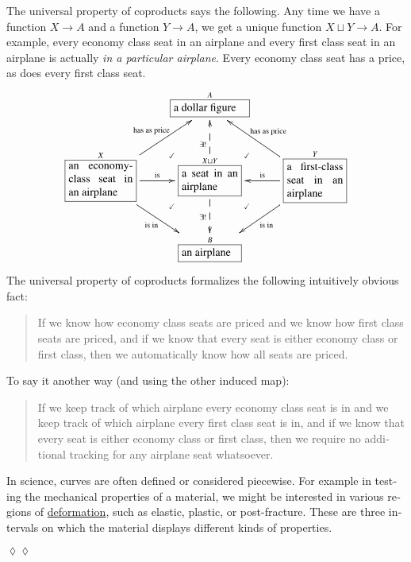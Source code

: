 \documentclass{book}
\def\tn{\textnormal}
\def\to{\rightarrow}
\newcommand{\LA}[2]{\ar[#1]^-{\tn {#2}}}
\newcommand{\LAL}[2]{\ar[#1]_-{\tn {#2}}}
\newcommand{\obox}[3]{\stackrel{#1}{\fbox{\parbox{#2}{#3}}}}
\theoremstyle{theoremENG}
\theoremstyle{lemmaENG}
\theoremstyle{propositionENG}
\theoremstyle{corollaryENG}
\theoremstyle{factENG}
\theoremstyle{remarkENG}
\theoremstyle{exampleENG}
\newtheorem{exampleENG}[subsubsection]{\begin{english}Example\end{english}}
\theoremstyle{warningENG}
\theoremstyle{questionENG}
\theoremstyle{guessENG}
\theoremstyle{answerENG}
\theoremstyle{constructionENG}
\theoremstyle{rulesENG}
\theoremstyle{excENG}
\theoremstyle{appENG}
\newtheorem{appENG}[subsubsection]{\begin{english}Application\end{english}}
\theoremstyle{definitionENG}
\theoremstyle{notationENG}
\theoremstyle{conjectureENG}
\theoremstyle{postulateENG}
\newenvironment{applicationENG}{\begin{appENG}}{\hspace*{\fill}$\lozenge\lozenge$\end{appENG}}
\theoremstyle{theoremRUS}
\theoremstyle{lemmaRUS}
\theoremstyle{propositionRUS}
\theoremstyle{corollaryRUS}
\theoremstyle{factRUS}
\theoremstyle{remarkRUS}
\theoremstyle{exampleRUS}
\theoremstyle{warningRUS}
\theoremstyle{questionRUS}
\theoremstyle{guessRUS}
\theoremstyle{answerRUS}
\theoremstyle{constructionRUS}
\theoremstyle{rulesRUS}
\theoremstyle{excRUS}
\theoremstyle{appRUS}
\theoremstyle{definitionRUS}
\theoremstyle{notationRUS}
\theoremstyle{conjectureRUS}
\theoremstyle{postulateRUS}
\begin{document}
\begin{english}
\begin{exampleENG}
The universal property of coproducts says the following. Any time we have a function $X\to A$ and a function $Y\to A$, we get a unique function $X\sqcup Y\to A$. For example, every economy class seat in an airplane and every first class seat in an airplane is actually {\em in a particular airplane}. Every economy class seat has a price, as does every first class seat.
\begin{align}
\xymatrix{
&\obox{A}{.9in}{a dollar figure}&\\
\obox{X}{.8in}{an economy-class seat in an airplane}\LA{ru}{has as price}\LA{r}{is}\LAL{dr}{is in}&\obox{X\sqcup Y}{.7in}{a seat in an airplane}\ar@{-->}[d]_{\exists!}\ar@{-->}[u]^{\exists!}\ar@{}[ur]|(.35){\checkmark}\ar@{}[dl]|(.35){\checkmark}\ar@{}[dr]|(.35){\checkmark}\ar@{}[ul]|(.35){\checkmark}&\obox{Y}{.7in}{a first-class seat in an airplane}\LAL{l}{is}\LAL{lu}{has as price}\LA{dl}{is in}\\
&\obox{B}{.7in}{an airplane}&
}
\end{align}
The universal property of coproducts formalizes the following intuitively obvious fact:
\begin{quote}
If we know how economy class seats are priced and we know how first class seats are priced, and if we know that every seat is either economy class or first class, then we automatically know how all seats are priced.
\end{quote}
To say it another way (and using the other induced map):
\begin{quote}
If we keep track of which airplane every economy class seat is in and we keep track of which airplane every first class seat is in, and if we know that every seat is either economy class or first class, then we require no additional tracking for any airplane seat whatsoever.
\end{quote}

\begin{russian} \end{russian}

\end{exampleENG}

\begin{applicationENG}[Piecewise defined curves]

In science, curves are often defined or considered piecewise. For example in testing the mechanical properties of a material, we might be interested in various regions of \href{http://en.wikipedia.org/wiki/Deformation_(engineering)}{deformation}, such as elastic, plastic, or post-fracture. These are three intervals on which the material displays different kinds of properties. 


\end{applicationENG}
\end{english}
\end{document}

